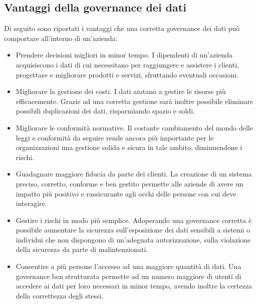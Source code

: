 \subsection{Vantaggi della governance dei dati}

Di seguito sono riportati i vantaggi che una corretta governance dei dati può comportare all'interno di un'azienda:\cite{google_data_governance}
\begin{itemize}
    \item Prendere decisioni migliori in minor tempo. I dipendenti di un'azienda acquisiscono i dati di cui necessitano per raggiungere e assistere i clienti, progettare e migliorare prodotti e servizi, sfruttando eventuali occasioni.
    \item Migliorare la gestione dei costi. I dati aiutano a gestire le risorse più efficacemente. Grazie ad una corretta gestione sarà inoltre possibile eliminare possibili duplicazioni dei dati, risparmiando spazio e soldi.
    \item Migliorare le conformità normative. Il costante cambiamento del mondo delle leggi e conformità da seguire rende ancora più importante per le organizzazioni una gestione solida e sicura in tale ambito, diminuendone i rischi.
    \item Guadagnare maggiore fiducia da parte dei clienti. La creazione di un sistema preciso, corretto, conforme e ben gestito permette alle aziende di avere un impatto più positivo e rassicurante agli occhi delle persone con cui deve interagire.
    \item Gestire i rischi in modo più semplice. Adoperando una governance corretta è possibile aumentare la sicurezza sull'esposizione dei dati sensibili a sistemi o individui che non dispongono di un'adeguata autorizzazione, sulla violazione della sicurezza da parte di malintenzionati.
    \item Consentire a più persone l'accesso ad una maggiore quantità di dati. Una governance ben strutturata permette ad un numero maggiore di utenti di accedere ai dati per loro necessari in minor tempo, avendo inoltre la certezza della correttezza degli stessi.
\end{itemize}

